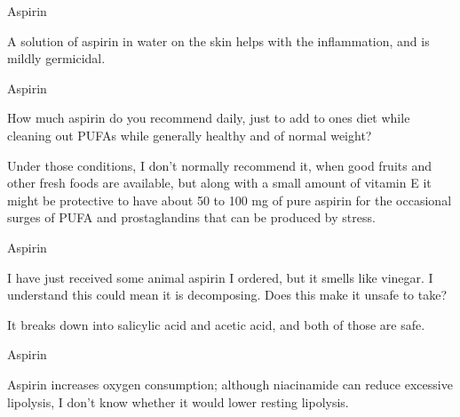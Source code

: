 \documentclass[11pt,oneside,openany,extrafontsizes]{memoir}
\begin{document}
\begin{standalonequote}{Aspirin}

    \begin{answer}
        A solution of aspirin in water on the skin helps with the inflammation, and is mildly germicidal.
    \end{answer}
\end{standalonequote}

\begin{qaexchange}{Aspirin}

    \begin{question}
        How much aspirin do you recommend daily, just to add to ones diet while cleaning out PUFAs while generally healthy and of normal weight?
    \end{question}

    \begin{answer}
        Under those conditions, I don't normally recommend it, when good fruits and other fresh foods are available, but along with a small amount of vitamin E it might be protective to have about 50 to 100 mg of pure aspirin for the occasional surges of PUFA and prostaglandins that can be produced by stress.
    \end{answer}
\end{qaexchange}

\begin{qaexchange}{Aspirin}

    \begin{question}
        I have just received some animal aspirin I ordered, but it smells like vinegar. I understand this could mean it is decomposing. Does this make it unsafe to take?
    \end{question}

    \begin{answer}
      It breaks down into salicylic acid and acetic acid, and both of those are safe.
    \end{answer}
\end{qaexchange}

\begin{standalonequote}{Aspirin}

    \begin{answer}
      Aspirin increases oxygen consumption; although niacinamide can reduce excessive lipolysis, I don't know whether it would lower resting lipolysis.
    \end{answer}
\end{standalonequote}
\end{document}

